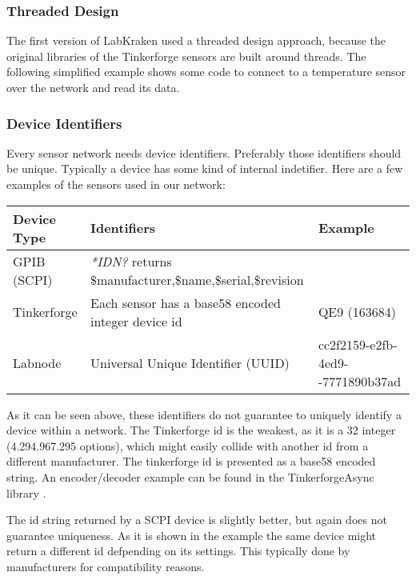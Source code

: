 \subsubsection{Threaded Design}
The first version of LabKraken used a threaded design approach, because the original libraries of the Tinkerforge sensors are built around threads. The following simplified example shows some code to connect to a temperature sensor over the network and read its data.


\subsubsection{Device Identifiers}
Every sensor network needs device identifiers. Preferably those identifiers should be unique. Typically a device has some kind of internal indetifier. Here are a few examples of the sensors used in our network:

\begin{table}[ht]
\centering
\begin{tabularx}{0.95\textwidth}{|l|p{6.5cm}|X|}
    \hline
    Device Type& Identifiers& Example\\
    \hline
    GPIB (SCPI)& \textit{*IDN?} returns \newline \$manufacturer,\$name,\$serial,\$revision& \\
    \hline
    Tinkerforge& Each sensor has a base58 encoded integer device id& QE9 (163684)\\
    \hline
    Labnode& Universal Unique Identifier (UUID) & cc2f2159-e2fb-4ed9-\newline8021-7771890b37ad\\
    \hline
\end{tabularx}
\end{table}

As it can be seen above, these identifiers do not guarantee to uniquely identify a device within a network. The Tinkerforge id is the weakest, as it is a \qty{32}{\bit} integer (4.294.967.295 options), which might easily collide with another id from a different manufacturer. The tinkerforge id is presented as a base58 encoded string. An encoder/decoder example can be found in the TinkerforgeAsync library \cite{TinkerforgeAsync}.

The id string returned by a SCPI device is slightly better, but again does not guarantee uniqueness. As it is shown in the example the same device might return a different id defpending on its settings. This typically done by manufacturers for compatibility reasons.

